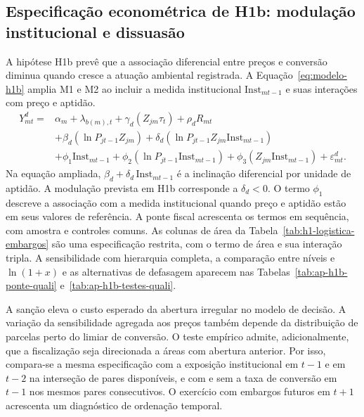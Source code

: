 \subsection{Especificação econométrica de H1b: modulação institucional e dissuasão}
\label{estrategia-h1b}

A hipótese H1b prevê que a associação diferencial entre preços e conversão diminua quando cresce a atuação ambiental registrada. A Equação~\eqref{eq:modelo-h1b} amplia M1 e M2 ao incluir a medida institucional $\mathrm{Inst}_{mt-1}$ e suas interações com preço e aptidão.
\begin{equation}
    \begin{aligned}
        Y_{mt}^d ={}& \alpha_m + \lambda_{b(m),t} + \gamma_d (Z_{jm}\tau_t) + \rho_d R_{mt} \\
        &+ \beta_d (\ln P_{jt-1} Z_{jm}) + \delta_d (\ln P_{jt-1} Z_{jm}\mathrm{Inst}_{mt-1})\\
        &+ \phi_1\mathrm{Inst}_{mt-1} + \phi_2 (\ln P_{jt-1}\mathrm{Inst}_{mt-1})
        + \phi_3 (Z_{jm}\mathrm{Inst}_{mt-1}) + \varepsilon_{mt}^d .
    \end{aligned}
    \label{eq:modelo-h1b}
\end{equation}
Na equação ampliada, $\beta_d+\delta_d\,\mathrm{Inst}_{mt-1}$ é a inclinação diferencial por unidade de aptidão. A modulação prevista em H1b corresponde a $\delta_d<0$. O termo $\phi_1$ descreve a associação com a medida institucional quando preço e aptidão estão em seus valores de referência. A ponte fiscal acrescenta os termos em sequência, com amostra e controles comuns. As colunas de área da Tabela~\ref{tab:h1-logistica-embargos} são uma especificação restrita, com o termo de área e sua interação tripla. A sensibilidade com hierarquia completa, a comparação entre níveis e $\ln(1+x)$ e as alternativas de defasagem aparecem nas Tabelas~\ref{tab:ap-h1b-ponte-quali} e~\ref{tab:ap-h1b-testes-quali}.

A sanção eleva o custo esperado da abertura irregular no modelo de decisão. A variação da sensibilidade agregada aos preços também depende da distribuição de parcelas perto do limiar de conversão. O teste empírico admite, adicionalmente, que a fiscalização seja direcionada a áreas com abertura anterior. Por isso, compara-se a mesma especificação com a exposição institucional em $t-1$ e em $t-2$ na interseção de pares disponíveis, e com e sem a taxa de conversão em $t-1$ nos mesmos pares consecutivos. O exercício com embargos futuros em $t+1$ acrescenta um diagnóstico de ordenação temporal.

